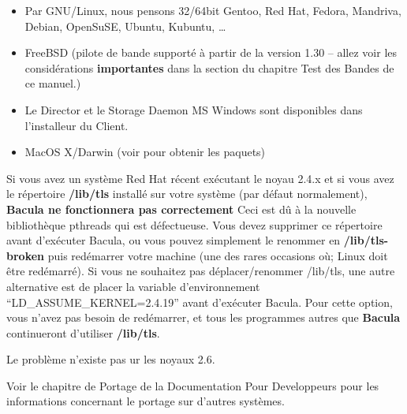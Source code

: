 \begin{itemize}
\item Par GNU/Linux, nous pensons 32/64bit Gentoo, Red Hat, Fedora, Mandriva,
    Debian, OpenSuSE, Ubuntu, Kubuntu, \dots

  \item FreeBSD (pilote de bande support\'e \`a partir de la version 1.30 --
    allez voir les consid\'erations {\bf importantes} dans la section
     du
    chapitre Test des Bandes de ce manuel.)

\item Le Director et le Storage Daemon MS Windows sont disponibles dans 
  l'installeur du Client.

\item  MacOS X/Darwin (voir 
    pour
   obtenir les paquets)  
\end{itemize}

Si vous avez un syst\`eme Red Hat r\'ecent ex\'ecutant le noyau 2.4.x et si
vous avez le r\'epertoire {\bf /lib/tls} install\'e sur votre syst\`eme (par
d\'efaut normalement), {\bf Bacula ne fonctionnera pas correctement} Ceci est
d\^u \`a la nouvelle biblioth\`eque pthreads qui est d\'efectueuse. Vous devez
supprimer ce r\'epertoire avant d'ex\'ecuter Bacula, ou vous pouvez simplement
le renommer en {\bf /lib/tls-broken} puis red\'emarrer votre machine (une des
rares occasions o\`u; Linux doit \^etre red\'emarr\'e).  Si vous ne souhaitez
pas d\'eplacer/renommer /lib/tls, une autre alternative est de placer la
variable d'environnement ``LD\_ASSUME\_KERNEL=2.4.19'' avant d'ex\'ecuter
Bacula. Pour cette option, vous n'avez pas besoin de red\'emarrer, et tous les
programmes autres que {\bf Bacula} continueront d'utiliser {\bf /lib/tls}.

Le probl\`eme n'existe pas ur les noyaux 2.6.

Voir le chapitre de Portage de la Documentation Pour Developpeurs pour les
informations concernant le portage sur d'autres syst\`emes.

